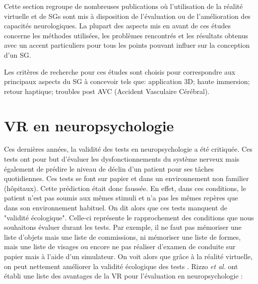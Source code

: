 Cette section regroupe de nombreuses publications où l'utilisation de la réalité virtuelle et de SGs sont mis à disposition de l'évaluation ou de l'amélioration des capacités neurologiques. La plupart des aspects mis en avant de ces études concerne les méthodes utilisées, les problèmes rencontrés et les résultats obtenus avec un accent particuliers pour tous les points pouvant influer sur la conception d'un SG.

Les critères de recherche pour ces études sont choisis pour correspondre aux principaux aspects du SG à concevoir tels que: application 3D; haute immersion; retour haptique; troubles post AVC (Accident Vasculaire Cérébral).

\section{VR en neuropsychologie}
	\label{sSoaVRNeuropsy}
	Ces dernières années, la validité des tests en neuropsychologie a été critiquée. Ces tests ont pour but d'évaluer les dysfonctionnements  du système nerveux mais également de prédire le niveau de déclin d'un patient pour ses tâches quotidiennes. Ces tests se font sur papier et dans un environnement non familier (hôpitaux). Cette prédiction était donc faussée. En effet, dans ces conditions, le patient n'est pas soumis aux mêmes stimuli et n'a pas les mêmes repères que dans son environnement habituel. On dit alors que ces tests manquent de "validité écologique". Celle-ci représente le rapprochement des conditions que nous souhaitons évaluer durant les tests. Par exemple, il ne faut pas mémoriser une liste d'objets mais une liste de commissions, ni mémoriser une liste de formes, mais une liste de visages ou encore ne pas réaliser d'examen de conduite sur papier mais à l'aide d'un simulateur. On voit alors que grâce à la réalité virtuelle, on peut nettement améliorer la validité écologique des tests \cite{VARSG4HC1}. Rizzo \textit{et al.} ont établi une liste des avantages de la VR pour l'évaluation en neuropsychologie \cite{Rizzo_analysisVRApplication}:
